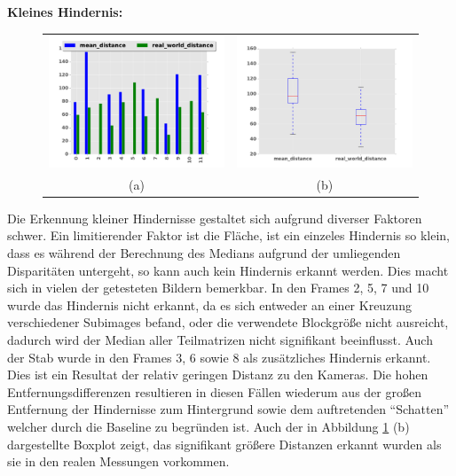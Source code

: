 \noindent
\textbf{Kleines Hindernis:}\\
\begin{figure}[h]
	\centering
	\begin{tabular}{cc}
	\includegraphics[width=7cm]{img/evaluation/diagrams/sub_tiny_bar}&
	\includegraphics[width=7cm]{img/evaluation/diagrams/sub_tiny_box}\\
	(a)	& (b)
	\end{tabular}
    \caption{}
    \label{fig:eval_tiny}
\end{figure}

\noindent
Die Erkennung kleiner Hindernisse gestaltet sich aufgrund diverser Faktoren schwer. Ein limitierender Faktor ist die Fläche, ist ein einzeles Hindernis so klein, dass es während der Berechnung des Medians aufgrund der umliegenden Disparitäten untergeht, so kann auch kein Hindernis erkannt werden. Dies macht sich in vielen der getesteten Bildern bemerkbar. In den Frames 2, 5, 7 und 10 wurde das Hindernis nicht erkannt, da es sich entweder an einer Kreuzung verschiedener Subimages befand, oder die verwendete Blockgröße nicht ausreicht, dadurch wird der Median aller Teilmatrizen nicht signifikant beeinflusst. Auch der Stab wurde in den Frames 3, 6 sowie 8 als zusätzliches Hindernis erkannt. Dies ist ein Resultat der relativ geringen Distanz zu den Kameras. Die hohen Entfernungsdifferenzen resultieren in diesen Fällen wiederum aus der großen Entfernung der Hindernisse zum Hintergrund sowie dem auftretenden \enquote{Schatten} welcher durch die Baseline zu begründen ist. Auch der in Abbildung \ref{fig:eval_tiny} (b) dargestellte Boxplot zeigt, das signifikant größere Distanzen erkannt wurden als sie in den realen Messungen vorkommen.

